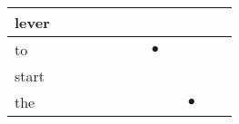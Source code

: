 \documentclass[landscape]{article}
\newcommand{\ssp}{\hspace{2pt}}
\newcommand{\mex}{\cellcolor{g}$\bullet$}
\begin{document}
\begin{tabular}{|l|p{10pt}|p{10pt}|p{10pt}|p{10pt}|p{10pt}|p{10pt}|p{10pt}|p{10pt}|p{10pt}|p{10pt}|p{10pt}|}
\hline
\ssp lever \ssp&\hspace{2pt}&\hspace{2pt}&\hspace{2pt}&\hspace{2pt}&\hspace{2pt}&\hspace{2pt}&\hspace{2pt}&\hspace{2pt}&\hspace{2pt}&\hspace{2pt}&\hspace{2pt}\\
\hline
\ssp \cellcolor{ref6}to \ssp&\hspace{2pt}&\hspace{2pt}&\hspace{2pt}&\hspace{2pt}&\hspace{2pt}&\hspace{2pt}&\hspace{2pt}\mex&\hspace{2pt}&\hspace{2pt}&\hspace{2pt}&\hspace{2pt}\\
\hline
\ssp start \ssp&\hspace{2pt}&\hspace{2pt}&\hspace{2pt}&\hspace{2pt}&\hspace{2pt}&\hspace{2pt}&\hspace{2pt}&\hspace{2pt}&\hspace{2pt}&\hspace{2pt}&\hspace{2pt}\\
\hline
\ssp \cellcolor{ref8}the \ssp&\hspace{2pt}&\hspace{2pt}&\hspace{2pt}&\hspace{2pt}&\hspace{2pt}&\hspace{2pt}&\hspace{2pt}&\hspace{2pt}&\hspace{2pt}\mex&\hspace{2pt}&\hspace{2pt}\\

\end{tabular}
\end{document}
